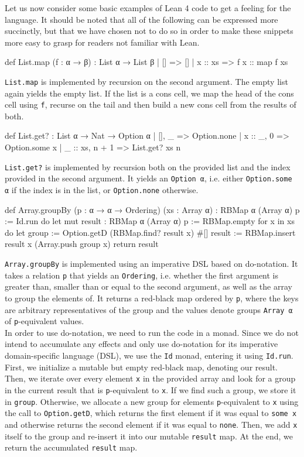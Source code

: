 Let us now consider some basic examples of Lean 4 code to get a feeling for the language. It should be noted that all of the following can be expressed more succinctly, but that we have chosen not to do so in order to make these snippets more easy to grasp for readers not familiar with Lean.
\begin{code}
def List.map (f : α → β) : List α → List β
  | []      => []
  | x :: xs => f x :: map f xs
\end{code}
\lstinline|List.map| is implemented by recursion on the second argument. The empty list again yields the empty list. If the list is a cons cell, we map the head of the cons cell using \lstinline|f|, recurse on the tail and then build a new cons cell from the results of both.
\begin{code}
def List.get? : List α → Nat → Option α
  | [],      _     => Option.none
  | x :: _,  0     => Option.some x
  | _ :: xs, n + 1 => List.get? xs n
\end{code}
\lstinline|List.get?| is implemented by recursion both on the provided list and the index provided in the second argument. It yields an \lstinline|Option α|, i.e. either \lstinline|Option.some α| if the index is in the list, or \lstinline|Option.none| otherwise.
\begin{code}
def Array.groupBy (p : α → α → Ordering) (xs : Array α)
  : RBMap α (Array α) p := Id.run do
  let mut result : RBMap α (Array α) p := RBMap.empty
  for x in xs do
    let group := Option.getD (RBMap.find? result x) #[]
    result := RBMap.insert result x (Array.push group x)
  return result
\end{code}
\lstinline|Array.groupBy| is implemented using an imperative DSL based on do-notation. It takes a relation \lstinline|p| that yields an \lstinline|Ordering|, i.e. whether the first argument is greater than, smaller than or equal to the second argument, as well as the array to group the elements of. It returns a red-black map ordered by \lstinline|p|, where the keys are arbitrary representatives of the group and the values denote groups \lstinline|Array α| of \lstinline|p|-equivalent values. \\
In order to use do-notation, we need to run the code in a monad. Since we do not intend to accumulate any effects and only use do-notation for its imperative domain-specific language (DSL), we use the \lstinline|Id| monad, entering it using \lstinline|Id.run|. First, we initialize a mutable but empty red-black map, denoting our result. Then, we iterate over every element \lstinline|x| in the provided array and look for a group in the current result that is \lstinline|p|-equivalent to \lstinline|x|. If we find such a group, we store it in \lstinline|group|. Otherwise, we allocate a new group for elements \lstinline|p|-equivalent to \lstinline|x| using the call to \lstinline|Option.getD|, which returns the first element if it was equal to \lstinline|some x| and otherwise returns the second element if it was equal to \lstinline|none|. Then, we add \lstinline|x| itself to the group and re-insert it into our mutable \lstinline|result| map. At the end, we return the accumulated \lstinline|result| map.

